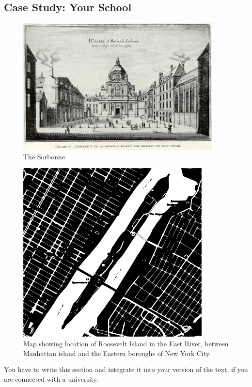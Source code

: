 \subsection{Case Study: Your School}\label{case-study-your-school}

\begin{figure}[htbp]
\centering
\includegraphics{images/Sorbonne.png}
\caption{The Sorbonne}
\end{figure}

\begin{figure}[htbp]
\centering
\includegraphics{images/roosevelt.png}
\caption{Map showing location of Roosevelt Island in the East River,
between Manhattan island and the Eastern boroughs of New York City.}
\end{figure}

You have to write this section and integrate it into your version of the
text, if you are connected with a university.

